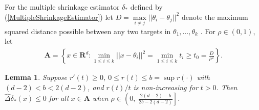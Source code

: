 \documentclass[11pt]{article}
\newtheorem{lemma}{Lemma}
\theoremstyle{definition}
\begin{document}
For the multiple shrinkage estimator $\delta_*$ defined by (\ref{MultipleShrinkageEstimator}) let  $D = \max\limits_{i\neq j} ||\theta_i - \theta_j||^2$ denote the maximum squared distance possible between any two targets in  $\theta_1,\ldots,\theta_k$ .  For $\rho \in (0,1)$, let 
\begin{align}
    \textbf{A} = \left\{x \in \mathbf{R}^d: \min\limits_{1\leq i \leq k} ||x - \theta_i||^2 = \min\limits_{1 \leq i \leq k} t_i \geq  t_0 = \frac{D}{\rho^2}\right\}.
  \label{A1Condition}
\end{align}

\begin{lemma}
    Suppose $r'(t) \ge 0$, $0 \leq r(t) \leq b = \sup r(\cdot)$ with $(d - 2) < b < 2(d - 2)$,  and $r(t)/t$ is non-increasing for $t > 0$. Then  $\hat{\Delta}\delta_*(x) \le 0$ for all $x \in \textbf{A}$ when $\rho \in \left(0,\;\frac{2(d - 2) - b}{2b - 2(d - 2)}\right]$.
    \label{LemmaA1brho}
\end{lemma}
\end{document}
